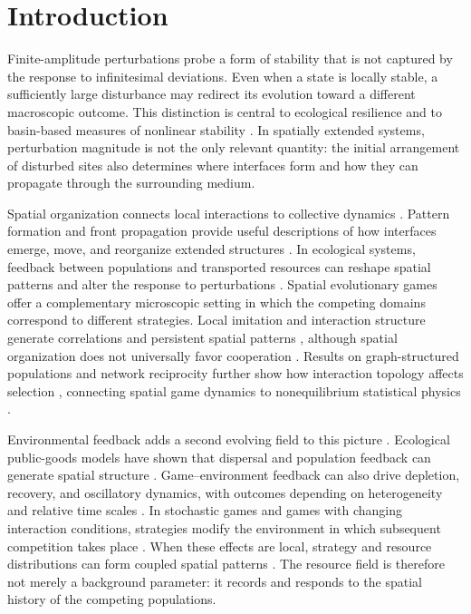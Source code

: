 \section{Introduction}

Finite-amplitude perturbations probe a form of stability that is not captured by the response to infinitesimal deviations. Even when a state is locally stable, a sufficiently large disturbance may redirect its evolution toward a different macroscopic outcome. This distinction is central to ecological resilience \cite{holling1973resilience,scheffer2001catastrophic} and to basin-based measures of nonlinear stability \cite{menck2013basin}. In spatially extended systems, perturbation magnitude is not the only relevant quantity: the initial arrangement of disturbed sites also determines where interfaces form and how they can propagate through the surrounding medium.

Spatial organization connects local interactions to collective dynamics \cite{levin1992pattern,durrett1994spatial}. Pattern formation and front propagation provide useful descriptions of how interfaces emerge, move, and reorganize extended structures \cite{cross1993patterns,vansaarloos2003fronts}. In ecological systems, feedback between populations and transported resources can reshape spatial patterns and alter the response to perturbations \cite{rietkerk2004patchiness,bel2012gradual,rietkerk2021tipping}. Spatial evolutionary games offer a complementary microscopic setting in which the competing domains correspond to different strategies. Local imitation and interaction structure generate correlations and persistent spatial patterns \cite{nowak1992spatial,nowak1994spatial}, although spatial organization does not universally favor cooperation \cite{hauert2004spatial}. Results on graph-structured populations and network reciprocity further show how interaction topology affects selection \cite{nowak2006rules,ohtsuki2006rule,allen2017structure}, connecting spatial game dynamics to nonequilibrium statistical physics \cite{szabo2007graphs,roca2009review,perc2017cooperation,szabo2002volunteering}.

Environmental feedback adds a second evolving field to this picture \cite{perc2010coevolutionary}. Ecological public-goods models have shown that dispersal and population feedback can generate spatial structure \cite{wakano2009spatial}. Game--environment feedback can also drive depletion, recovery, and oscillatory dynamics, with outcomes depending on heterogeneity and relative time scales \cite{weitz2016oscillating,hauert2019asymmetric,tilman2020feedback}. In stochastic games and games with changing interaction conditions, strategies modify the environment in which subsequent competition takes place \cite{hilbe2018stochastic,su2019transitions}. When these effects are local, strategy and resource distributions can form coupled spatial patterns \cite{lin2019spatial,chen2025localized,zhong2026spatial}. The resource field is therefore not merely a background parameter: it records and responds to the spatial history of the competing populations.

